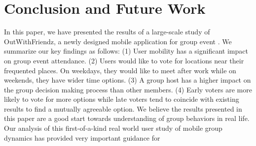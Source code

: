 \section{Conclusion and Future Work} 
\label{sec:conclusion} 

In this paper, we have presented the results of a large-scale study of OutWithFriendz,
a newly designed mobile application for group event . We summarize
our key findings as follows: (1) User mobility has a significant impact on group event attendance.
(2) Users would like to vote for locations near their frequented places. On weekdays, they would 
like to meet after work while on weekends, they have wider time options. (3) A group host 
has a higher impact on the group decision making process than other members. (4) Early
voters are more likely to vote for more options while late voters tend to coincide with existing
results to find a mutually agreeable option. We believe the results presented in this paper
are a good start towards  understanding of group  behaviors in real life. Our analysis
of this first-of-a-kind real world user study of mobile group dynamics has provided very 
important guidance for 

